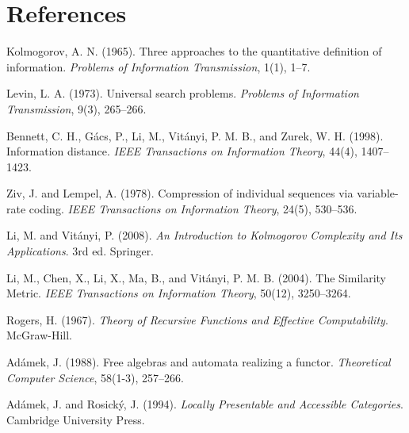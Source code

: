 \documentclass[12pt,a4paper]{article}
\theoremstyle{plain}
\theoremstyle{definition}
\begin{document}
\section*{References}
\begin{enumerate}[label={[\arabic*]}]
    \item Kolmogorov, A. N. (1965). Three approaches to the quantitative definition of
    information. \textit{Problems of Information Transmission}, 1(1), 1--7.
    \item Levin, L. A. (1973). Universal search problems. \textit{Problems of Information
    Transmission}, 9(3), 265--266.
    \item Bennett, C. H., G\'acs, P., Li, M., Vit\'anyi, P. M. B., and Zurek, W. H. (1998).
    Information distance. \textit{IEEE Transactions on Information Theory}, 44(4), 1407--1423.
    \item Ziv, J. and Lempel, A. (1978). Compression of individual sequences via
    variable-rate coding. \textit{IEEE Transactions on Information Theory}, 24(5), 530--536.
    \item Li, M. and Vit\'anyi, P. (2008). \textit{An Introduction to Kolmogorov Complexity
    and Its Applications}. 3rd ed. Springer.
    \item Li, M., Chen, X., Li, X., Ma, B., and Vit\'anyi, P. M. B. (2004). The Similarity Metric. \textit{IEEE Transactions on Information Theory}, 50(12), 3250--3264.
    \item Rogers, H. (1967). \textit{Theory of Recursive Functions and Effective Computability}. McGraw-Hill.
    \item Ad\'amek, J. (1988). Free algebras and automata realizing a functor. \textit{Theoretical Computer Science}, 58(1-3), 257--266.
    \item Ad\'amek, J. and Rosick\'y, J. (1994). \textit{Locally Presentable and Accessible
    Categories}. Cambridge University Press.
\end{enumerate}
\end{document}
